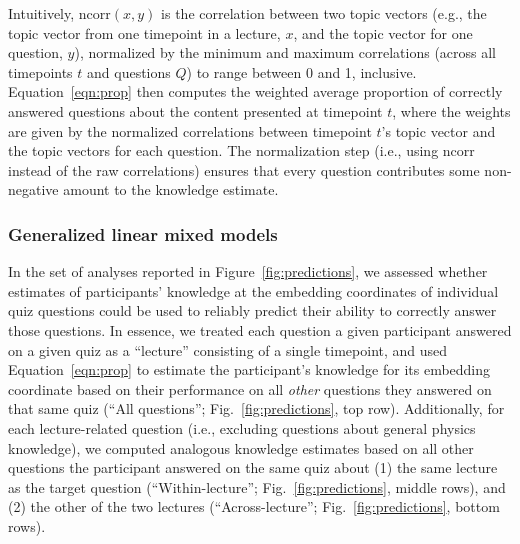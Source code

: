 \documentclass[10pt]{article}
\begin{document}
Intuitively, $\mathrm{ncorr}(x, y)$ is the correlation between two topic
vectors (e.g., the topic vector from one timepoint in a lecture, $x$, and the
topic vector for one question, $y$), normalized by the minimum and maximum
correlations (across all timepoints $t$ and questions $Q$) to range between 0
and 1, inclusive. Equation~\ref{eqn:prop} then computes the weighted average
proportion of correctly answered questions about the content presented at
timepoint $t$, where the weights are given by the normalized correlations
between timepoint $t$'s topic vector and the topic vectors for each question.
The normalization step (i.e., using $\mathrm{ncorr}$ instead of the raw
correlations) ensures that every question contributes some non-negative amount
to the knowledge estimate.

\subsubsection*{Generalized linear mixed models}\label{subsec:glmm}

In the set of analyses reported in Figure~\ref{fig:predictions}, we assessed
whether estimates of participants' knowledge at the embedding coordinates of
individual quiz questions could be used to reliably predict their ability to
correctly answer those questions. In essence, we treated each question a given
participant answered on a given quiz as a ``lecture'' consisting of a single
timepoint, and used Equation~\ref{eqn:prop} to estimate the participant's
knowledge for its embedding coordinate based on their performance on all
\textit{other} questions they answered on that same quiz (``All questions'';
Fig.~\ref{fig:predictions}, top row). Additionally, for each lecture-related
question (i.e., excluding questions about general physics knowledge), we
computed analogous knowledge estimates based on all other questions the
participant answered on the same quiz about (1) the same lecture as the target
question (``Within-lecture''; Fig.~\ref{fig:predictions}, middle rows), and (2)
the other of the two lectures (``Across-lecture''; Fig.~\ref{fig:predictions},
bottom rows).
\end{document}
